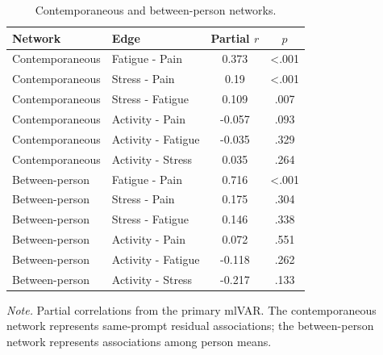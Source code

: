 \begin{table}[H]
\raggedright
\caption{Contemporaneous and between-person networks.}
\label{tab:sup-contemporaneous-between}
\footnotesize
\begingroup
\setlength{\tabcolsep}{4pt}
\renewcommand{\arraystretch}{1.08}
\noindent
\begin{tabular*}{\textwidth}{@{\extracolsep{\fill}}llcc@{}}
\toprule
Network & Edge & Partial $r$ & $p$ \\
\midrule
Contemporaneous & Fatigue - Pain & 0.373 & <.001 \\
Contemporaneous & Stress - Pain & 0.19 & <.001 \\
Contemporaneous & Stress - Fatigue & 0.109 & .007 \\
Contemporaneous & Activity - Pain & -0.057 & .093 \\
Contemporaneous & Activity - Fatigue & -0.035 & .329 \\
Contemporaneous & Activity - Stress & 0.035 & .264 \\
Between-person & Fatigue - Pain & 0.716 & <.001 \\
Between-person & Stress - Pain & 0.175 & .304 \\
Between-person & Stress - Fatigue & 0.146 & .338 \\
Between-person & Activity - Pain & 0.072 & .551 \\
Between-person & Activity - Fatigue & -0.118 & .262 \\
Between-person & Activity - Stress & -0.217 & .133 \\
\bottomrule
\end{tabular*}
\par\vspace{3pt}\noindent\parbox{\textwidth}{\footnotesize\textit{Note.} Partial correlations from the primary mlVAR. The contemporaneous network represents same-prompt residual associations; the between-person network represents associations among person means.}
\endgroup
\end{table}
